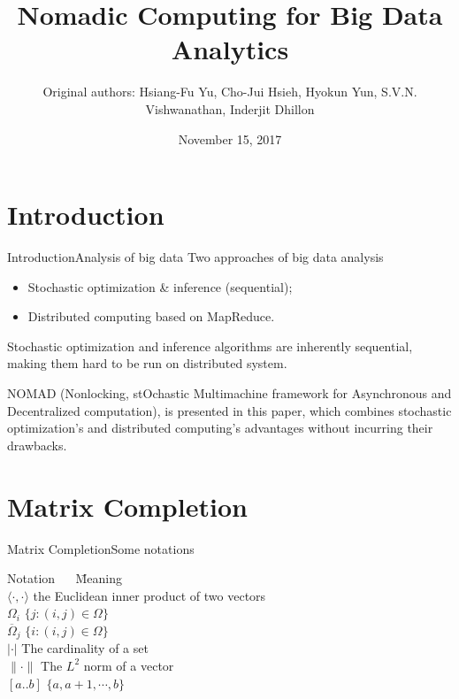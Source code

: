 \documentclass{beamer}
\title[Nomadic Computing for Big Data Analytics]{Nomadic Computing for Big Data Analytics}
\institute{}
\author[Delivered by Chen Shaoyuan]{Original authors: Hsiang-Fu Yu, Cho-Jui Hsieh, Hyokun Yun, S.V.N. Vishwanathan, Inderjit Dhillon}
\date{November 15, 2017}
\begin{document}
  \begin{frame}
    \titlepage
  \end{frame}

  \section{Introduction}
  \begin{frame}{Introduction}{Analysis of big data}
    Two approaches of big data analysis
    \begin{itemize}
      \item Stochastic optimization \& inference (sequential);
      \item Distributed computing based on MapReduce.
    \end{itemize}
    \pause
    Stochastic optimization and inference algorithms are inherently sequential, making them hard to be run on distributed system. \par
    \pause
    NOMAD (Nonlocking, stOchastic Multimachine framework for Asynchronous and Decentralized computation), is presented in this paper, which combines stochastic optimization's and distributed computing's advantages without incurring their drawbacks.
  \end{frame}
  
  \section{Matrix Completion}
  \begin{frame}{Matrix Completion}{Some notations}
    \begin{tabbing}
      Notation $\quad$ \=  Meaning \\
      $\langle \cdot , \cdot \rangle$ \> the Euclidean inner product of two vectors \\
      $\Omega_i$ \> $\{j : (i, j) \in \Omega\}$ \\
      $\overline{\Omega}_j$ \> $\{i : (i, j) \in \Omega\}$ \\
      $|\cdot|$ \> The cardinality of a set \\
      $\| \cdot \|$ \> The $L^2$ norm of a vector \\
      $[a..b]$ \> $\{a, a+1, \cdots, b\}$
    \end{tabbing}
  \end{frame}
  
\end{document}
